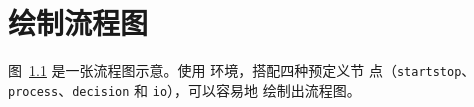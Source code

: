 ﻿%

\chapter{绘制流程图}

图~\ref{fig:flow_chart} 是一张流程图示意。使用  环境，搭配四种预定义节
点（\verb|startstop|、\verb|process|、\verb|decision| 和 \verb|io|），可以容易地
绘制出流程图。

\begin{figure}[!htp]
  \centering
  
  \label{fig:flow_chart}
\end{figure}
